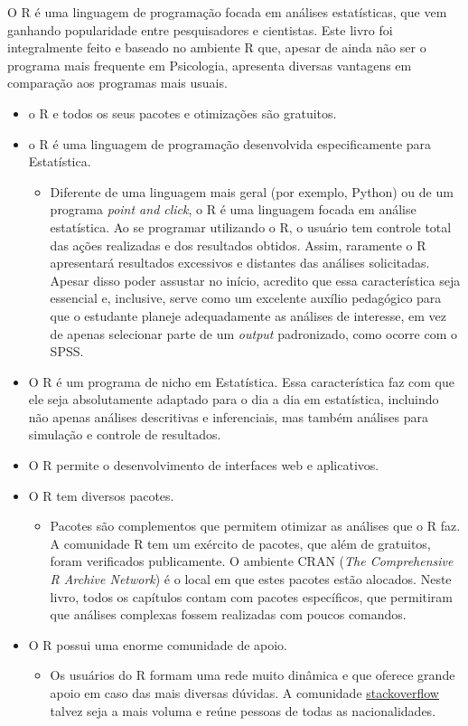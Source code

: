 \documentclass[
]{book}
\providecommand{\tightlist}{%
  \setlength{\itemsep}{0pt}\setlength{\parskip}{0pt}}
\begin{document}
O R é uma linguagem de programação focada em análises estatísticas, que vem ganhando popularidade entre pesquisadores e cientistas. Este livro foi integralmente feito e baseado no ambiente R que, apesar de ainda não ser o programa mais frequente em Psicologia, apresenta diversas vantagens em comparação aos programas mais usuais.

\begin{itemize}
\item
  o R e todos os seus pacotes e otimizações são gratuitos.
\item
  o R é uma linguagem de programação desenvolvida especificamente para Estatística.

  \begin{itemize}
  \tightlist
  \item
    Diferente de uma linguagem mais geral (por exemplo, Python) ou de um programa \emph{point and click}, o R é uma linguagem focada em análise estatística. Ao se programar utilizando o R, o usuário tem controle total das ações realizadas e dos resultados obtidos. Assim, raramente o R apresentará resultados excessivos e distantes das análises solicitadas. Apesar disso poder assustar no início, acredito que essa característica seja essencial e, inclusive, serve como um excelente auxílio pedagógico para que o estudante planeje adequadamente as análises de interesse, em vez de apenas selecionar parte de um \emph{output} padronizado, como ocorre com o SPSS.
  \end{itemize}
\item
  O R é um programa de nicho em Estatística. Essa característica faz com que ele seja absolutamente adaptado para o dia a dia em estatística, incluindo não apenas análises descritivas e inferenciais, mas também análises para simulação e controle de resultados.
\item
  O R permite o desenvolvimento de interfaces web e aplicativos.
\item
  O R tem diversos pacotes.

  \begin{itemize}
  \tightlist
  \item
    Pacotes são complementos que permitem otimizar as análises que o R faz. A comunidade R tem um exército de pacotes, que além de gratuitos, foram verificados publicamente. O ambiente CRAN (\emph{The Comprehensive R Archive Network}) é o local em que estes pacotes estão alocados. Neste livro, todos os capítulos contam com pacotes específicos, que permitiram que análises complexas fossem realizadas com poucos comandos.
  \end{itemize}
\item
  O R possui uma enorme comunidade de apoio.

  \begin{itemize}
  \tightlist
  \item
    Os usuários do R formam uma rede muito dinâmica e que oferece grande apoio em caso das mais diversas dúvidas. A comunidade \href{https://stackoverflow.com/}{stackoverflow} talvez seja a mais voluma e reúne pessoas de todas as nacionalidades.
  \end{itemize}
\end{itemize}
\end{document}
